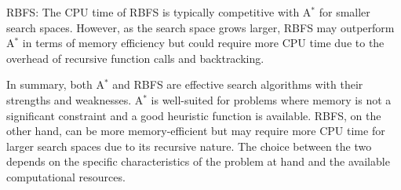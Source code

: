 \documentclass{article}
\begin{document}
 RBFS: The CPU time of RBFS is typically competitive with A$^*$ for smaller search spaces. However, as the search space grows larger, RBFS may outperform A$^*$ in terms of memory efficiency but could require more CPU time due to the overhead of recursive function calls and backtracking.

In summary, both A$^*$ and RBFS are effective search algorithms with their strengths and weaknesses. A$^*$ is well-suited for problems where memory is not a significant constraint and a good heuristic function is available. RBFS, on the other hand, can be more memory-efficient but may require more CPU time for larger search spaces due to its recursive nature. The choice between the two depends on the specific characteristics of the problem at hand and the available computational resources.
\end{document}
